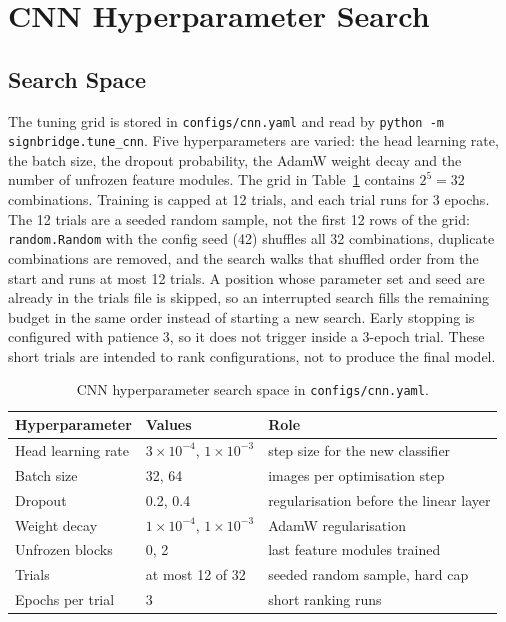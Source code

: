 \section{CNN Hyperparameter Search}
\label{sec:cnn-hyperparameters}

\subsection{Search Space}

The tuning grid is stored in \texttt{configs/cnn.yaml} and read by \texttt{python -m signbridge.tune\_cnn}. Five hyperparameters are varied: the head learning rate, the batch size, the dropout probability, the AdamW weight decay and the number of unfrozen feature modules. The grid in Table~\ref{tab:cnn-search-space} contains $2^5=32$ combinations. Training is capped at 12 trials, and each trial runs for 3 epochs. The 12 trials are a seeded random sample, not the first 12 rows of the grid: \texttt{random.Random} with the config seed (42) shuffles all 32 combinations, duplicate combinations are removed, and the search walks that shuffled order from the start and runs at most 12 trials. A position whose parameter set and seed are already in the trials file is skipped, so an interrupted search fills the remaining budget in the same order instead of starting a new search. Early stopping is configured with patience 3, so it does not trigger inside a 3-epoch trial. These short trials are intended to rank configurations, not to produce the final model.

\begin{table}[htbp]
\centering
\caption{CNN hyperparameter search space in \texttt{configs/cnn.yaml}.}
\label{tab:cnn-search-space}
\begin{tabular}{lll}
\toprule
Hyperparameter & Values & Role \\
\midrule
Head learning rate & $3\times10^{-4}$, $1\times10^{-3}$ & step size for the new classifier \\
Batch size & 32, 64 & images per optimisation step \\
Dropout & 0.2, 0.4 & regularisation before the linear layer \\
Weight decay & $1\times10^{-4}$, $1\times10^{-3}$ & AdamW regularisation \\
Unfrozen blocks & 0, 2 & last feature modules trained \\
\midrule
Trials & at most 12 of 32 & seeded random sample, hard cap \\
Epochs per trial & 3 & short ranking runs \\
\bottomrule
\end{tabular}
\end{table}

